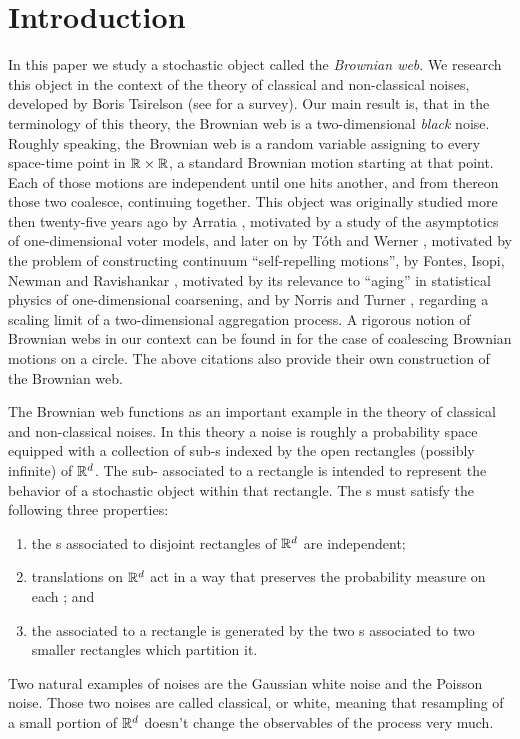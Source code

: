 {\section{Introduction}
In this paper we study a stochastic object called the \emph{Brownian web}. We
research this object in the context of the theory of classical and
non-classical noises, developed by Boris Tsirelson
(see \cite{tsirelson-nonclassical-stochastic-flows} for a survey).
Our main result
is, that in the terminology of this theory, the Brownian web is a
two-dimensional \emph{black} noise.
Roughly speaking, the Brownian web is a random variable assigning to
every space-time point in $\mathbb{R}\times\mathbb{R}$, a standard Brownian motion starting
at that point. Each of those motions are independent until one hits another,
and from thereon those two coalesce, continuing together. This object was
originally studied more then twenty-five years ago by Arratia \cite{arratia}, motivated
by a study of the asymptotics of one-dimensional voter models, and later on
by T\'{o}th and Werner \cite{toth-werner},
motivated by the problem of constructing continuum
``self-repelling motions'', by Fontes, Isopi, Newman and Ravishankar
\cite{fontes-et-al},
motivated by its relevance to ``aging'' in statistical physics of
one-dimensional coarsening, and by Norris and Turner
\cite{norris-turner-convergence-to-bw},\cite{norris-turner-planar-aggregation}
regarding a scaling limit of a two-dimensional aggregation process.
A rigorous notion of Brownian webs in our context
can be found in \cite{tsirelson-lecture-course} for the case of coalescing
Brownian motions on a circle.  The above citations also provide
their own construction of the Brownian web.

The Brownian web functions as an important example in the theory of
classical and non-classical noises. In this
theory a noise is roughly a probability space equipped with a collection
of sub-\sigfield{}s indexed by the open rectangles (possibly infinite) of
$\mathbb{R}^d$.  The sub-\sigfield{} associated to a rectangle is intended to
represent the behavior of a stochastic object within that rectangle.
The \sigfield{}s must satisfy the following three properties:
\begin{enumerate}
\item the \sigfield{}s associated to disjoint rectangles of $\mathbb{R}^d$ are
independent;
\item translations on $\mathbb{R}^d$ act in a way that preserves the
probability measure on each \sigfield{}; and
\item the \sigfield{}
associated to a rectangle is generated by the two \sigfield{}s
associated to two smaller rectangles which partition it.
\end{enumerate}
Two natural examples of noises are the Gaussian white noise
and the Poisson noise. Those two noises are called classical, or white,
meaning that
resampling of a small portion of $\mathbb{R}^d$ doesn't change the observables of the
process very much.

}
